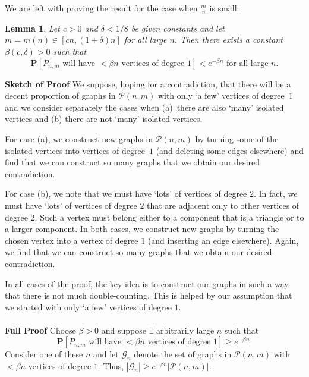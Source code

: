 \documentclass{article}
\newtheorem{Lemma}[Theorem]{Lemma}
\newtheorem{Proof of Theorem}{Proof of Theorem}
\begin{document}
We are left with proving the result for the case when $\frac{m}{n}$ is small:















\begin{Lemma} \label{pen2}
Let $c>0$ and $\delta<1/8$ be given constants and let $m=m(n) \in [cn, (1+\delta)n]$ for all large $n$. 
Then there exists a constant $\beta(c,\delta) >0$ such that 
\begin{displaymath}
\mathbf{P}[P_{n,m} \textrm{ will have } < \beta n \textrm{ vertices of degree } 1] < e^{-\beta n} 
\textrm{ for all large } n.
\end{displaymath} 
\end{Lemma} 
\textbf{Sketch of Proof}
We suppose, hoping for a contradiction, that there will 
be a decent proportion of graphs in $\mathcal{P}(n,m)$ with
only `a few' vertices of degree~$1$ and
we consider separately the cases when 
(a)~there are also `many' isolated vertices and
(b) there are not `many' isolated vertices.

For case (a), we construct new graphs in $\mathcal{P}(n,m)$ by turning
some of the isolated vertices into vertices of degree~$1$ 
(and deleting some edges elsewhere)
and find that we can construct so many graphs that we obtain our desired contradiction.

For case (b), we note that we must have `lots' of vertices of degree $2$.
In fact, we must have `lots' of vertices of degree $2$ that are adjacent only to other vertices of degree $2$.
Such a vertex must belong either to a component that is a triangle or to a larger component.
In both cases, we construct new graphs by turning the chosen vertex into a vertex of degree $1$
(and inserting an edge elsewhere).
Again, we find that we can construct so many graphs that we obtain our desired contradiction.

In all cases of the proof, 
the key idea is to construct our graphs in such a way that there is not much double-counting.
This is helped by our assumption that we started with only `a few' vertices of degree $1$. \\
\\
\textbf{Full Proof}
Choose $\beta >0$ and suppose $\exists$ arbitrarily large $n$ such that 
\begin{displaymath}
\mathbf{P}[P_{n,m} \textrm{ will have $< \beta n$ vertices of degree $1$}] \geq e^{-\beta n}.
\end{displaymath}
Consider one of these $n$ and
let $\mathcal{G}_{n}$ denote the set of graphs in $\mathcal{P}(n,m)$ with 
$< \beta n$ vertices of degree $1$. 
Thus, $|\mathcal{G}_{n}| \geq e^{-\beta n} |\mathcal{P}(n,m)|$.
\end{document}
